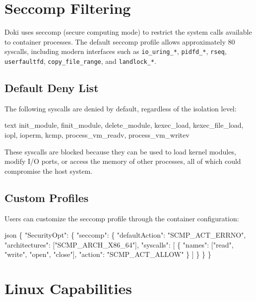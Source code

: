 \section{Seccomp Filtering}
\label{sec:seccomp}

Doki uses seccomp (secure computing mode) to restrict the system calls
available to container processes. The default seccomp profile allows
approximately 80 syscalls, including modern interfaces such as
\texttt{io\_uring\_*}, \texttt{pidfd\_*}, \texttt{rseq},
\texttt{userfaultfd}, \texttt{copy\_file\_range}, and
\texttt{landlock\_*}.

\subsection{Default Deny List}
\label{sec:default-deny}

The following syscalls are denied by default, regardless of the
isolation level:

\begin{codebox}[title={Syscalls denied by default seccomp profile}]{text}
init\_module, finit\_module, delete\_module,
kexec\_load, kexec\_file\_load,
iopl, ioperm, kcmp,
process\_vm\_readv, process\_vm\_writev
\end{codebox}

These syscalls are blocked because they can be used to load kernel
modules, modify I/O ports, or access the memory of other processes,
all of which could compromise the host system.

\subsection{Custom Profiles}
\label{sec:custom-profiles}

Users can customize the seccomp profile through the container
configuration:

\begin{codebox}[title={Custom seccomp configuration}]{json}
\{
  "SecurityOpt": \{
    "seccomp": \{
      "defaultAction": "SCMP\_ACT\_ERRNO",
      "architectures": ["SCMP\_ARCH\_X86\_64"],
      "syscalls": [
        \{
          "names": ["read", "write", "open", "close"],
          "action": "SCMP\_ACT\_ALLOW"
        \}
      ]
    \}
  \}
\}
\end{codebox}

\section{Linux Capabilities}
\label{sec:capabilities}

